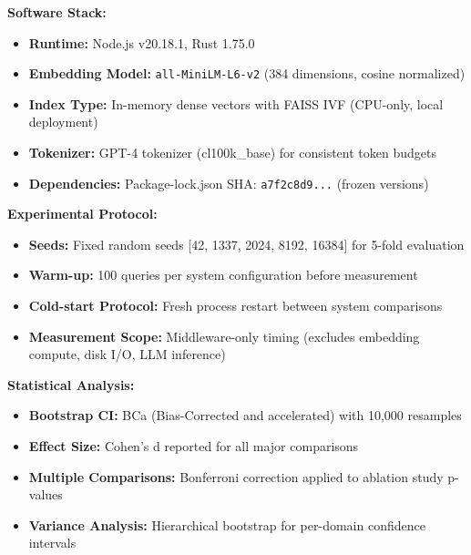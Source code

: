 \textbf{Software Stack:}
\begin{itemize}
    \item \textbf{Runtime:} Node.js v20.18.1, Rust 1.75.0
    \item \textbf{Embedding Model:} \texttt{all-MiniLM-L6-v2} (384 dimensions, cosine normalized)
    \item \textbf{Index Type:} In-memory dense vectors with FAISS IVF (CPU-only, local deployment)
    \item \textbf{Tokenizer:} GPT-4 tokenizer (cl100k\_base) for consistent token budgets
    \item \textbf{Dependencies:} Package-lock.json SHA: \texttt{a7f2c8d9...} (frozen versions)
\end{itemize}

\textbf{Experimental Protocol:}
\begin{itemize}
    \item \textbf{Seeds:} Fixed random seeds [42, 1337, 2024, 8192, 16384] for 5-fold evaluation
    \item \textbf{Warm-up:} 100 queries per system configuration before measurement
    \item \textbf{Cold-start Protocol:} Fresh process restart between system comparisons
    \item \textbf{Measurement Scope:} Middleware-only timing (excludes embedding compute, disk I/O, LLM inference)
\end{itemize}

\textbf{Statistical Analysis:}
\begin{itemize}
    \item \textbf{Bootstrap CI:} BCa (Bias-Corrected and accelerated) with 10,000 resamples
    \item \textbf{Effect Size:} Cohen's d reported for all major comparisons
    \item \textbf{Multiple Comparisons:} Bonferroni correction applied to ablation study p-values
    \item \textbf{Variance Analysis:} Hierarchical bootstrap for per-domain confidence intervals
\end{itemize}

